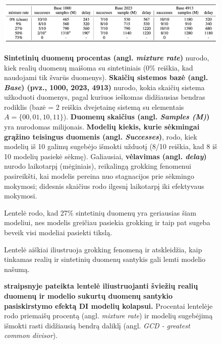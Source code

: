 \documentclass{VUMIFInfKursinis}
\begin{document}
\begin{figure}[H]
    \centering
    \includegraphics[scale=0.5]{img/gorkking.png}
    \caption{
        \textbf{\cite{DesniuPasiulymai} straipsnyje pateikta lentelė iliustruojanti šviežių realių duomenų ir modelio sukurtų duomenų santykio pasiskirstymo efektą DI modelių kolapsui.} 
        Procentai lentelėje rodo priemaišų procentą (angl. \textsl{mixture rate}) ir modelių sugebėjimą išmokti rasti didžiausią bendrą daliklį (angl. \textsl{GCD - greatest common divisor}).
        }
       \label{img:gorkking}
        \textbf{Sintetinių duomenų procentas (angl. \textsl{mixture rate})} nurodo, kiek realių duomenų maišoma su sintetiniais (0\% reiškia, kad naudojami tik švarūs duomenys). \textbf{Skaičių sistemos bazė (angl. \textsl{Base}) (pvz., 1000, 2023, 4913)} nurodo, kokia skaičių sistema užkoduoti duomenys, pagal kuriuos ieškomas didžiausias bendras rodiklis (bazė = 2 reiškia dvejetainę sistemą su elementais $A=\{00,01,10,11\}$). \textbf{Duomenų skaičius (angl. \textsl{Samples (M)})} yra nurodomas milijonais. \textbf{Modelių kiekis, kurie sėkmingai grąžino teisingus duomenis (angl. \textsl{Successes})}, rodo, kiek modelių iš 10 galimų sugebėjo išmokti užduotį (8/10 reiškia, kad 8 iš 10 modelių pasiekė sėkmę). Galiausiai, \textbf{vėlavimas (angl. \textsl{delay})} nurodo laikotarpį (mėginiais), reikalingą grokking fenomenui pasireikšti, kai modelis pereina nuo stagnacijos prie sėkmingo mokymosi; didesnis skaičius rodo ilgesnį laikotarpį iki efektyvaus mokymosi.
        
        Lentelė rodo, kad 27\% sintetinių duomenų yra geriausias šiam modeliui, nes modelis greičiau pasiekia grokking ir taip pat sugeba beveik visi modeliai pasiekti tikslą.

        
        Lentelė aiškiai iliustruoja grokking fenomeną ir atskleidžia, kaip tinkamas realių ir sintetinių duomenų santykis gali lemti modelio našumą.
\end{figure}
\end{document}

